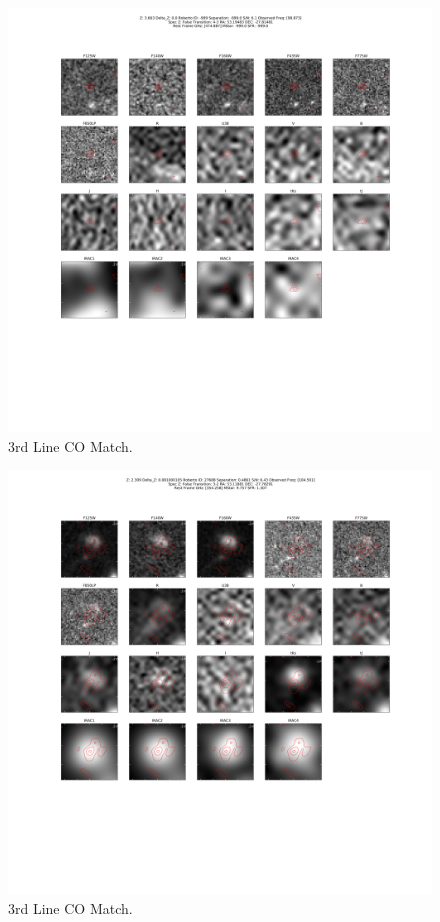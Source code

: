 \begin{figure}[tbp]
\centering \includegraphics[width=120mm]{Matched/ASPECS_Cutout_5.png}
\caption{3rd Line CO Match.}
\label{fig:Match_Three}
\end{figure}

\begin{figure}[tbp]
\centering \includegraphics[width=120mm]{Matched/ASPECS_Cutout_6.png}
\caption{3rd Line CO Match.}
\label{fig:Match_Three}
\end{figure}

